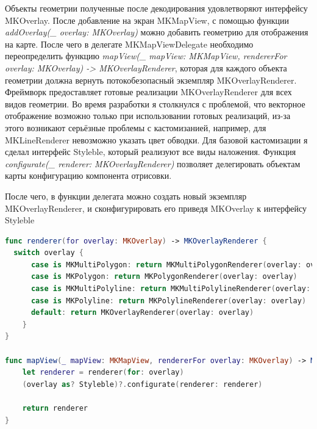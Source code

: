       Объекты геометрии полученные после декодирования удовлетворяют интерфейсу MKOverlay. После добавление на экран MKMapView, с помощью функции \textit{addOverlay(\_ overlay: MKOverlay)} можно добавить геометрию для отображения на карте. После чего в делегате MKMapViewDelegate необходимо переопределить функцию \textit{mapView(\_ mapView: MKMapView, rendererFor overlay: MKOverlay) -> MKOverlayRenderer}, которая для каждого объекта геометрии должна вернуть потокобезопасный экземпляр MKOverlayRenderer. Фреймворк предоставляет готовые реализации MKOverlayRenderer для всех видов геометрии. Во время разработки я столкнулся с проблемой, что векторное отображение возможно только при использовании готовых реализаций, из-за этого возникают серьёзные проблемы с кастомизанией, например, для MKLineRenderer невозможно указать цвет обводки.
      Для базовой кастомизации я сделал интерфейс Styleble, который реализуют все виды наложения. Функция \textit{configurate(\_ renderer: MKOverlayRenderer)} позволяет делегировать объектам карты конфигурацию компонента отрисовки.


      После чего, в функции делегата можно создать новый экземпляр MKOverlayRenderer, и сконфигурировать его приведя MKOverlay к интерфейсу Styleble

      \begin{lstlisting}[language=swift,caption={Реализация функции создания и конфигурации компонентов MKOverlayRenderer}]
func renderer(for overlay: MKOverlay) -> MKOverlayRenderer {
  switch overlay {
      case is MKMultiPolygon: return MKMultiPolygonRenderer(overlay: overlay)
      case is MKPolygon: return MKPolygonRenderer(overlay: overlay)
      case is MKMultiPolyline: return MKMultiPolylineRenderer(overlay: overlay)
      case is MKPolyline: return MKPolylineRenderer(overlay: overlay)
      default: return MKOverlayRenderer(overlay: overlay)
    }
}

func mapView(_ mapView: MKMapView, rendererFor overlay: MKOverlay) -> MKOverlayRenderer {
    let renderer = renderer(for: overlay)
    (overlay as? Styleble)?.configurate(renderer: renderer)

    return renderer
}
      \end{lstlisting}

